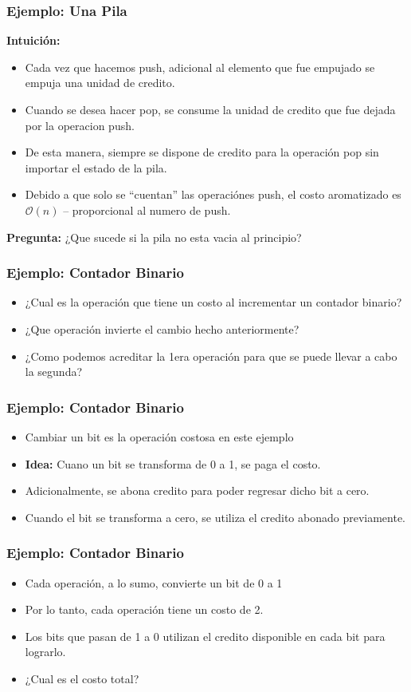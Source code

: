 \documentclass{beamer}
\begin{document}
\begin{frame}
\frametitle{Ejemplo: Una Pila}
{\bf Intuici\'on:}
\begin{itemize}
    \item{Cada vez que hacemos push, adicional al elemento que fue empujado
    se empuja una unidad de credito.}
    \item{Cuando se desea hacer pop, se consume la unidad de credito que fue
    dejada por la operacion push.}
    \item{De esta manera, siempre se dispone de credito para la operaci\'on
    pop sin importar el estado de la pila.}
    \item{Debido a que solo se ``cuentan'' las operaci\'ones push, el costo
    aromatizado es $\mathcal{O}(n)$ -- proporcional al numero de push.}
\end{itemize}
{\bf Pregunta: } ¿Que sucede si la pila no esta vacia al principio?
\end{frame}

\begin{frame}
\frametitle{Ejemplo: Contador Binario}
\begin{itemize}
    \item{¿Cual es la operaci\'on que tiene un costo al incrementar un contador binario?}
    \item{¿Que operaci\'on invierte el cambio hecho anteriormente?}
    \item{¿Como podemos acreditar la 1era operaci\'on para que se puede llevar a cabo la segunda?}
\end{itemize}
\end{frame}

\begin{frame}
\frametitle{Ejemplo: Contador Binario}
\begin{itemize}
    \item{Cambiar un bit es la operaci\'on costosa en este ejemplo}
    \item{{\bf Idea:} Cuano un bit se transforma de 0 a 1, se paga el costo.}
    \item{Adicionalmente, se abona credito para poder regresar dicho bit a cero.}
    \item{Cuando el bit se transforma a cero, se utiliza el credito abonado previamente.}
\end{itemize}
\end{frame}

\begin{frame}
\frametitle{Ejemplo: Contador Binario}
\begin{itemize}
    \item{Cada operaci\'on, a lo sumo, convierte un bit de 0 a 1}
    \item{Por lo tanto, cada operaci\'on tiene un costo de 2.}
    \item{Los bits que pasan de 1 a 0 utilizan el credito disponible en cada
    bit para lograrlo.}
    \item{¿Cual es el costo total?}
\end{itemize}
\end{frame}
\end{document}
